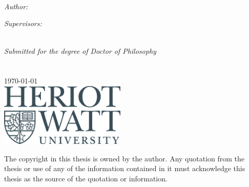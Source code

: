 \begin{titlepage}

    \begin{center}
        
        \HRule \\[0.4cm] %
        {\huge \bfseries \ttitle}\\[0.4cm] %
        \HRule \\[1cm] %
        
        \begin{minipage}{0.4\textwidth}
        \begin{flushleft} \large
        \emph{Author:}\\
        \authornames %
        \end{flushleft}
        \end{minipage}
        \begin{minipage}{0.4\textwidth}
            \vspace{0.6cm}
        \begin{flushright} \large
        \emph{Supervisors:} \\
        \supname %
        \end{flushright}
        \end{minipage}\\[4cm]
        
        \large \textit{Submitted for the degree of Doctor of Philosophy}\\[0.5cm] %


        \textsc{\LARGE \univname}\\[0.5cm] %
        
        \deptname\\[0.5cm] %
        
        {\large \today}\\[4cm] %
        \includegraphics[width=6cm]{./Figures/HWUlogo.jpg} %

        \vfill

        \small{The copyright in this thesis is owned by the author. Any quotation from the thesis or use of any of the information contained in it must acknowledge this thesis as the source of the quotation or information.}
        

    \end{center}
    
\end{titlepage}
